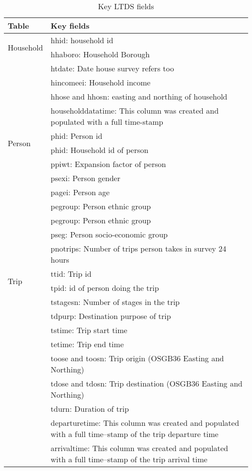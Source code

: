 \begin{center}
\begin{table}[h!]
\caption{Key LTDS fields}
    \begin{tabular}{ | p{2.2cm} | p{12cm} |}
    \hline
    \textbf{Table} & \textbf{Key fields} \\ \hline
    \multirow{2}{*}{Household} & hhid: household id \\
     & hhaboro: Household Borough \\
     & htdate: Date house survey refers too \\
     & hincomeei: Household income \\
     & hhose and hhosn: easting and northing of household \\ 
     & householddatatime: This column was created and populated with a full time-stamp \\ \hline
   \multirow{2}{*}{Person} & phid: Person id \\
     & phid: Household id of person \\
     & ppiwt: Expansion factor of person \\
     & psexi: Person gender \\
     & pagei: Person age \\
     & pegroup: Person ethnic group \\
     & pegroup: Person ethnic group \\
     & pseg: Person socio-economic group \\
     & pnotrips: Number of trips person takes in survey 24 hours \\ \hline
     \multirow{2}{*}{Trip} & ttid: Trip id \\
     & tpid: id of person doing the trip \\
     & tstagesn: Number of stages in the trip  \\
     & tdpurp: Destination purpose of trip \\
     & tstime: Trip start time \\
     & tetime: Trip end time \\
     & toose and toosn: Trip origin (OSGB36 Easting and Northing) \\
     & tdose and tdosn: Trip destination (OSGB36 Easting and Northing) \\
     & tdurn: Duration of trip \\ 
     & departuretime: This column was created and populated with a full time--stamp of the trip departure time \\
     & arrivaltime: This column was created and populated with a full time--stamp of the trip arrival time \\ \hline

\end{tabular}
\end{table}
\end{center}
